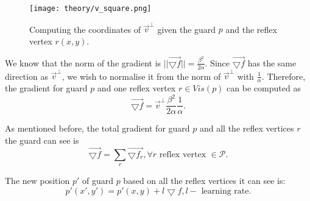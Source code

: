 \begin{figure}[h!]
    \centering
    \texttt{[image: theory/v\_square.png]}
    \caption{Computing the coordinates of $\vec v^\perp$ given the guard $p$ and the reflex vertex $r(x, y)$.}
    \label{fig:vsquare}
\end{figure}

We know that the norm of the gradient is $||\vec{\bigtriangledown f}|| = \frac{\beta^2}{2\alpha}$. Since $\vec{\bigtriangledown f}$ has the same direction as $\vec v^\perp$, we wish to normalise it from the norm of $\vec v^\perp$ with $\frac 1 \alpha$. Therefore, the gradient for guard $p$ and one reflex vertex $r \in Vis(p)$ can be computed as $$\vec{\bigtriangledown f} = \vec v^\perp \frac{\beta^2}{2\alpha} \frac 1 \alpha.$$

As mentioned before, the total gradient for guard $p$ and all the reflex vertices $r$ the guard can see is $$\vec{\bigtriangledown f} = \sum_r \vec{\bigtriangledown f_r}, \forall r \text{ reflex vertex } \in \mathcal P.$$

The new position $p'$ of guard $p$ based on all the reflex vertices it can see is: $$p'(x', y') = p'(x, y) + l\bigtriangledown f, l - \text{ learning rate}.$$





    

    

